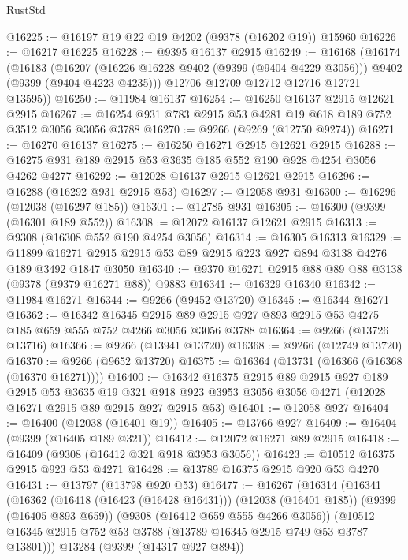 \begin{lexlean}{RustStd}
\begin{coremodule}
@16225 := @16197 @19 @22 @19 @4202 (@9378 (@16202 @19)) @15960
@16226 := @16217 @16225
@16228 := @9395 @16137 @2915
@16249 := @16168
    (@16174
      (@16183
        (@16207 (@16226 @16228 @9402 (@9399 (@9404 @4229 @3056))) @9402 (@9399 (@9404 @4223 @4235)))
        @12706
        @12709
        @12712
        @12716
        @12721
        @13595))
@16250 := @11984 @16137
@16254 := @16250 @16137 @2915 @12621 @2915
@16267 := @16254 @931 @783 @2915 @53 @4281 @19 @618 @189 @752 @3512 @3056 @3056 @3788
@16270 := @9266 (@9269 (@12750 @9274))
@16271 := @16270 @16137
@16275 := @16250 @16271 @2915 @12621 @2915
@16288 := @16275 @931 @189 @2915 @53 @3635 @185 @552 @190 @928 @4254 @3056 @4262 @4277
@16292 := @12028 @16137 @2915 @12621 @2915
@16296 := @16288 (@16292 @931 @2915 @53)
@16297 := @12058 @931
@16300 := @16296 (@12038 (@16297 @185))
@16301 := @12785 @931
@16305 := @16300 (@9399 (@16301 @189 @552))
@16308 := @12072 @16137 @12621 @2915
@16313 := @9308 (@16308 @552 @190 @4254 @3056)
@16314 := @16305 @16313
@16329 := @11899 @16271 @2915 @2915 @53 @89 @2915 @223 @927 @894 @3138 @4276 @189 @3492 @1847 @3050
@16340 := @9370 @16271 @2915 @88 @89 @88 @3138 (@9378 (@9379 @16271 @88)) @9883
@16341 := @16329 @16340
@16342 := @11984 @16271
@16344 := @9266 (@9452 @13720)
@16345 := @16344 @16271
@16362 := @16342
    @16345
    @2915
    @89
    @2915
    @927
    @893
    @2915
    @53
    @4275
    @185
    @659
    @555
    @752
    @4266
    @3056
    @3056
    @3788
@16364 := @9266 (@13726 @13716)
@16366 := @9266 (@13941 @13720)
@16368 := @9266 (@12749 @13720)
@16370 := @9266 (@9652 @13720)
@16375 := @16364 (@13731 (@16366 (@16368 (@16370 @16271))))
@16400 := @16342
    @16375
    @2915
    @89
    @2915
    @927
    @189
    @2915
    @53
    @3635
    @19
    @321
    @918
    @923
    @3953
    @3056
    @3056
    @4271
    (@12028 @16271 @2915 @89 @2915 @927 @2915 @53)
@16401 := @12058 @927
@16404 := @16400 (@12038 (@16401 @19))
@16405 := @13766 @927
@16409 := @16404 (@9399 (@16405 @189 @321))
@16412 := @12072 @16271 @89 @2915
@16418 := @16409 (@9308 (@16412 @321 @918 @3953 @3056))
@16423 := @10512 @16375 @2915 @923 @53 @4271
@16428 := @13789 @16375 @2915 @920 @53 @4270
@16431 := @13797 (@13798 @920 @53)
@16477 := @16267
    (@16314
      (@16341
        (@16362
          (@16418 (@16423 (@16428 @16431)))
          (@12038 (@16401 @185))
          (@9399 (@16405 @893 @659))
          (@9308 (@16412 @659 @555 @4266 @3056))
          (@10512 @16345 @2915 @752 @53 @3788 (@13789 @16345 @2915 @749 @53 @3787 @13801)))
        @13284
        (@9399 (@14317 @927 @894))

\end{coremodule}
\end{lexlean}
